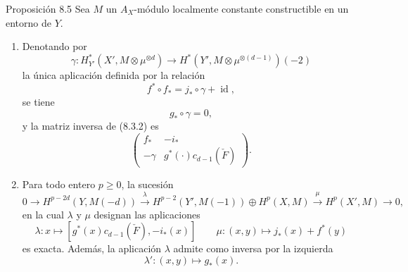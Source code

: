 \begin{statement}{Proposición 8.5}
Sea $M$ un $A_X$-módulo localmente constante constructible en un entorno de $Y$.
\begin{enumerate}[label=\alph*)]
\item Denotando por
\[
\gamma:H_{Y'}^*(X',M\otimes\mu^{\otimes d})\to
H^*(Y',M\otimes\mu^{\otimes(d-1)})(-2)
\]
la única aplicación definida por la relación
\[
f^*\circ f_* = j_*\circ\gamma+\operatorname{id},
\tag{8.5.1}
\]
se tiene
\[
g_*\circ\gamma=0,
\tag{8.5.2}
\]
y la matriz inversa de (8.3.2) es
\[
\begin{pmatrix}
f_*&-i_*\\
-\gamma&g^*(\cdot)c_{d-1}(\check F)
\end{pmatrix}.
\tag{8.5.3}
\]
\item Para todo entero $p\ge0$, la sucesión
\[
0\to H^{p-2d}(Y,M(-d))
\xrightarrow{\lambda}
H^{p-2}(Y',M(-1))\oplus H^p(X,M)
\xrightarrow{\mu}
H^p(X',M)\to0,
\]
en la cual $\lambda$ y $\mu$ designan las aplicaciones
\[
\lambda : x\longmapsto [g^*(x)c_{d-1}(\check F),-i_*(x)]
\qquad
\mu : (x,y)\mapsto j_*(x)+f^*(y)
\]
es exacta. Además, la aplicación $\lambda$ admite como inversa por la izquierda
\[
\lambda' : (x,y)\longmapsto g_*(x).
\]
\end{enumerate}
\end{statement}
